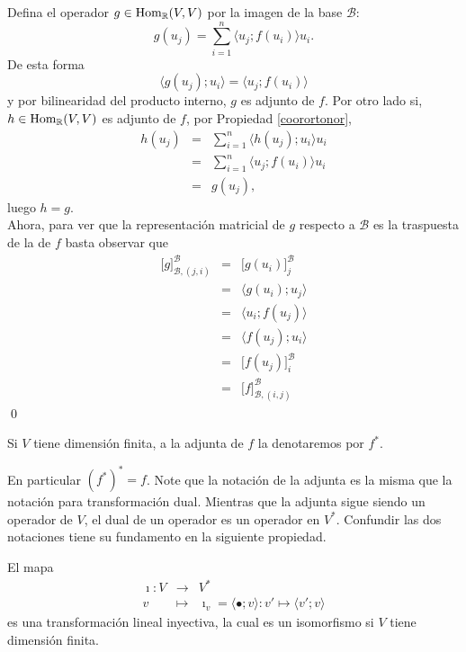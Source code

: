 \dem Defina el operador $g\in\operatorname{Hom}_\mathbb{R}(V,V)$ por la imagen de la base $\mathcal{B}$:
\[
g(u_j)=\sum_{i=1}^n\langle u_j;f(u_i)\rangle u_i.
\]
De esta forma
\[
\langle g(u_j);u_i\rangle=\langle u_j;f(u_i)\rangle
\]
y por bilinearidad del producto interno, $g$ es adjunto de $f$. Por otro lado si, $h\in\operatorname{Hom}_\mathbb{R}(V,V)$ es adjunto de $f$, por Propiedad \ref{coorortonor},
\begin{eqnarray*}
h(u_j) & = & \sum_{i=1}^n \langle h(u_j);u_i\rangle u_i\\
         & = & \sum_{i=1}^n \langle u_j;f(u_i)\rangle u_i\\
         & = & g(u_j),
\end{eqnarray*}
luego $h=g$.\\
Ahora, para ver que la representaci\'on matricial de $g$ respecto a $\mathcal{B}$ es la traspuesta de la de $f$ basta observar que
\begin{eqnarray*}
\Big[g\Big]^{\mathcal{B}}_{\mathcal{B},(j,i)} & = & \Big[g(u_i)\Big]^{\mathcal{B}}_j\\
  & = & \langle g(u_i);u_j \rangle\\
  & = & \langle u_i;f(u_j) \rangle\\
  & = & \langle f(u_j);u_i\rangle\\
  & = & \Big[f(u_j)\Big]^{\mathcal{B}}_i\\
  & = & \Big[f\Big]^{\mathcal{B}}_{\mathcal{B},(i,j)}
\end{eqnarray*}
\qed

\begin{nota}
Si $V$ tiene dimensi\'on finita, a la adjunta de $f$ la denotaremos por $f^*$.
\end{nota}

\begin{obs}
En particular $(f^*)^*=f$. Note que la notaci\'on de la adjunta es la misma que la notaci\'on para transformaci\'on dual. Mientras que la adjunta sigue siendo un operador de $V$, el dual de un operador es un operador en $V^*$. Confundir las dos notaciones tiene su fundamento en la siguiente propiedad.
\end{obs}

\begin{pro}
El mapa
\begin{eqnarray*}
\imath: V & \longrightarrow & V^*\\
            v & \longmapsto & \imath_v=\langle \bullet; v\rangle: v'\mapsto\langle v';v\rangle
\end{eqnarray*}
es una transformaci\'on lineal inyectiva, la cual es un isomorfismo si $V$ tiene dimensi\'on finita.
\end{pro}

